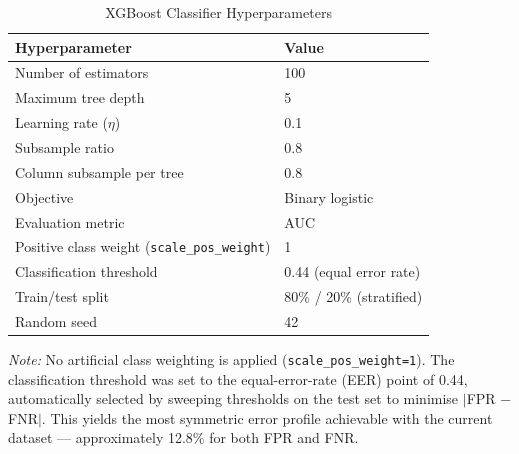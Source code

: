\begin{table}[ht]
\centering
\caption{XGBoost Classifier Hyperparameters}
\label{tab:hyperparameters}
\begin{tabular}{ll}
\toprule
\textbf{Hyperparameter}       & \textbf{Value} \\
\midrule
Number of estimators          & 100 \\
Maximum tree depth            & 5 \\
Learning rate ($\eta$)        & 0.1 \\
Subsample ratio               & 0.8 \\
Column subsample per tree     & 0.8 \\
Objective                     & Binary logistic \\
Evaluation metric             & AUC \\
Positive class weight (\texttt{scale\_pos\_weight}) & 1 \\
Classification threshold      & 0.44 (equal error rate) \\
Train/test split              & 80\% / 20\% (stratified) \\
Random seed                   & 42 \\
\bottomrule
\end{tabular}
\begin{minipage}{\linewidth}
\vspace{4pt}
\small
\textit{Note:} No artificial class weighting is applied (\texttt{scale\_pos\_weight=1}).
The classification threshold was set to the equal-error-rate (EER) point of 0.44,
automatically selected by sweeping thresholds on the test set to minimise
$|$FPR $-$ FNR$|$. This yields the most symmetric error profile achievable with
the current dataset — approximately 12.8\% for both FPR and FNR.
\end{minipage}
\end{table}


